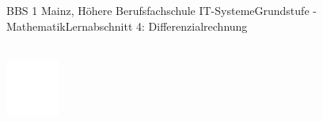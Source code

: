 \documentclass[oneside,openany,headings=optiontotoc,11pt,numbers=noenddot]{scrreprt}
\begin{document}
\begin{worksheet}{BBS 1 Mainz, Höhere Berufsfachschule IT-Systeme}{Grundstufe - Mathematik}{Lernabschnitt 4: Differenzialrechnung}
\begin{framed}
		\end{framed}
		\begin{framed}
			\noindent
			\footnotesize{\color{codegray}{Vorschlag für die Steigung}}\\
			\includegraphics[width=0.13\textwidth]{../../empty.jpg}
		\end{framed}
	\end{worksheet}
\end{document}
